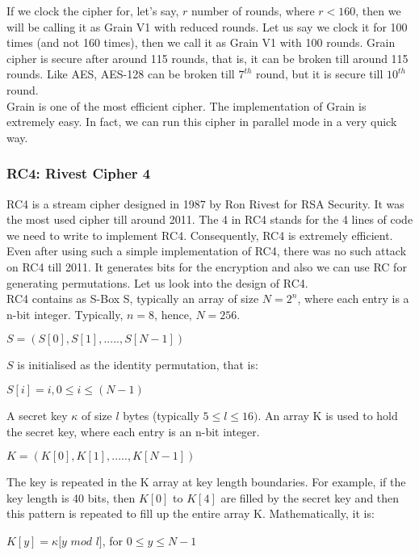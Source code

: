 \documentclass[11pt]{article}
\begin{document}
\newline
If we clock the cipher for, let's say, $r$ number of rounds, where $r < 160$, then we will be calling it as Grain V1 with reduced rounds. Let us say we clock it for 100 times (and not 160 times), then we call it as Grain V1 with 100 rounds. Grain cipher is secure after around 115 rounds, that is, it can be broken till around 115 rounds. Like AES, AES-128 can be broken till $7^{th}$ round, but it is secure till $10^{th}$ round.\\
\newline
Grain is one of the most efficient cipher. The implementation of Grain is extremely easy. In fact, we can run this cipher in parallel mode in a very quick way.

\subsubsection{RC4: Rivest Cipher 4}
RC4 is a stream cipher designed in 1987 by Ron Rivest for RSA Security. It was the most used cipher till around 2011. The 4 in RC4 stands for the 4 lines of code we need to write to implement RC4. Consequently, RC4 is extremely efficient. Even after using such a simple implementation of RC4, there was no such attack on RC4 till 2011. It generates bits for the encryption and also we can use RC for generating permutations. Let us look into the design of RC4.\\
\newline
RC4 contains as S-Box S, typically an array of size $N = 2^n$, where each entry is a n-bit integer. Typically, $n = 8$, hence, $N = 256$. 
\begin{center}
    $S = (S[0], S[1],....., S[N-1])$
\end{center}
$S$ is initialised as the identity permutation, that is:
\begin{center}
    $S[i] = i, 0\leq i\leq (N-1)$
\end{center}
A secret key $\kappa$ of size $l$ bytes (typically $5 \leq l \leq 16)$. An array K is used to hold the secret key, where each entry is an n-bit integer.
\begin{center}
    $K = (K[0], K[1],....., K[N-1]) $
\end{center}
The key is repeated in the K array at key length boundaries. For example, if the key length is 40 bits, then $K[0]$ to $K[4]$ are filled by the secret key and then this pattern is repeated to fill up the entire array K. Mathematically, it is:
\begin{center}
    $K[y] = \kappa[y$ $ mod $ $l]$, for $0 \leq y \leq N-1$
\end{center}
\end{document}
